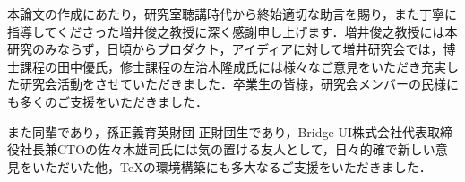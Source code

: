 \begin{acknowledgment}

本論文の作成にあたり，研究室聴講時代から終始適切な助言を賜り，また丁寧に指導してくださった増井俊之教授に深く感謝申し上げます．増井俊之教授には本研究のみならず，日頃からプロダクト，アイディアに対して増井研究会では，博士課程の田中優氏，修士課程の左治木隆成氏には様々なご意見をいただき充実した研究会活動をさせていただきました．卒業生の皆様，研究会メンバーの民様にも多くのご支援をいただきました．

また同輩であり，孫正義育英財団\cite{eeg} 正財団生であり，Bridge UI株式会社代表取締役社長兼CTOの佐々木雄司氏には気の置ける友人として，日々的確で新しい意見をいただいた他，\TeX の環境構築にも多大なるご支援をいただきました．

\end{acknowledgment}
